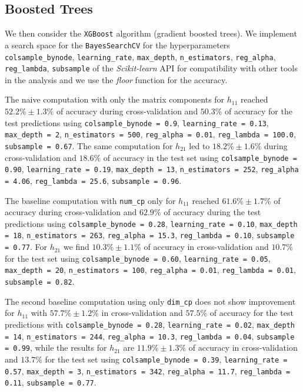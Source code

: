 \subsection{Boosted Trees}
    We then consider the \texttt{XGBoost} algorithm (gradient boosted trees). We implement a search space for the \texttt{BayesSearchCV} for the hyperparameters \texttt{colsample\_bynode}, \texttt{learning\_rate}, \texttt{max\_depth}, \texttt{n\_estimators}, \texttt{reg\_alpha}, \texttt{reg\_lambda}, \texttt{subsample} of the \textit{Scikit-learn} API for compatibility with other tools in the analysis and we use the \textit{floor} function for the accuracy.
    
    The naive computation with only the matrix components for $h_{11}$ reached $52.2\% \pm 1.3\%$ of accuracy during cross-validation and $50.3\%$ of accuracy for the test predictions using \texttt{colsample\_bynode = 0.9}, \texttt{learning\_rate = 0.13}, \texttt{max\_depth = 2}, \texttt{n\_estimators = 500}, \texttt{reg\_alpha = 0.01}, \texttt{reg\_lambda = 100.0}, \texttt{subsample = 0.67}. The same computation for $h_{21}$ led to $18.2\% \pm 1.6\%$ during cross-validation and $18.6\%$ of accuracy in the test set using \texttt{colsample\_bynode = 0.90}, \texttt{learning\_rate = 0.19}, \texttt{max\_depth = 13}, \texttt{n\_estimators = 252}, \texttt{reg\_alpha = 4.06}, \texttt{reg\_lambda = 25.6}, \texttt{subsample = 0.96}.
    
    The baseline computation with \texttt{num\_cp} only for $h_{11}$ reached $61.6\% \pm 1.7\%$ of accuracy during cross-validation and $62.9\%$ of accuracy during the test predictions using \texttt{colsample\_bynode = 0.28}, \texttt{learning\_rate = 0.10}, \texttt{max\_depth = 18}, \texttt{n\_estimators = 263}, \texttt{reg\_alpha = 15.3}, \texttt{reg\_lambda = 0.10}, \texttt{subsample = 0.77}. For $h_{21}$ we find $10.3\% \pm 1.1\%$ of accuracy in cross-validation and $10.7\%$ for the test set using \texttt{colsample\_bynode = 0.60}, \texttt{learning\_rate = 0.05}, \texttt{max\_depth = 20}, \texttt{n\_estimators = 100}, \texttt{reg\_alpha = 0.01}, \texttt{reg\_lambda = 0.01}, \texttt{subsample = 0.82}.
    
    The second baseline computation using only \texttt{dim\_cp} does not show improvement for $h_{11}$ with $57.7\% \pm 1.2\%$ in cross-validation and $57.5\%$ of accuracy for the test predictions with \texttt{colsample\_bynode = 0.28}, \texttt{learning\_rate = 0.02}, \texttt{max\_depth = 14}, \texttt{n\_estimators = 244}, \texttt{reg\_alpha = 10.3}, \texttt{reg\_lambda = 0.04}, \texttt{subsample = 0.99}, while the results for $h_{21}$ are $11.9\% \pm 1.3\%$ of accuracy in cross-validation and $13.7\%$ for the test set using \texttt{colsample\_bynode = 0.39}, \texttt{learning\_rate = 0.57}, \texttt{max\_depth = 3}, \texttt{n\_estimators = 342}, \texttt{reg\_alpha = 11.7}, \texttt{reg\_lambda = 0.11}, \texttt{subsample = 0.77}.
    
